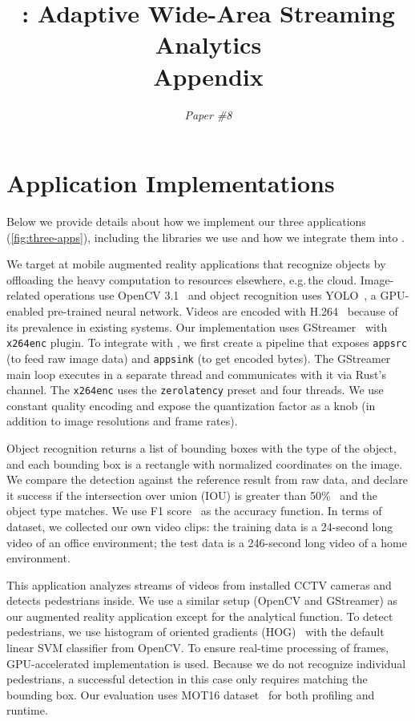 \documentclass[twocolumn, 9pt]{article}
\begin{document}
\title{\sysname{}: Adaptive Wide-Area Streaming Analytics \\ Appendix}
\author{ \textit{Paper \#8} }
\date{}
\maketitle

\section{Application Implementations}
\label{appendix:appl-impl}

Below we provide details about how we implement our three applications
(\autoref{fig:three-apps}), including the libraries we use and how we integrate
them into \sysname{}.

 We target at mobile augmented reality applications
that recognize objects by offloading the heavy computation to resources
elsewhere, e.g.\,the cloud.  Image-related operations use OpenCV
3.1~\cite{opencvlibrary} and object recognition uses YOLO~\cite{darknet13,
  redmon2016yolo9000}, a GPU-enabled pre-trained neural network. Videos are
encoded with H.264~\cite{richardson2011h} because of its prevalence in existing
systems. Our implementation uses GStreamer~\cite{gstreamer} with
\texttt{x264enc} plugin. To integrate with \sysname{}, we first create a
pipeline that exposes \texttt{appsrc} (to feed raw image data) and
\texttt{appsink} (to get encoded bytes). The GStreamer main loop executes in a
separate thread and \sysname{} communicates with it via Rust's channel. The
\texttt{x264enc} uses the \texttt{zerolatency} preset and four threads. We use
constant quality encoding and expose the quantization factor as a knob (in
addition to image resolutions and frame rates).

Object recognition returns a list of bounding boxes with the type of the object,
and each bounding box is a rectangle with normalized coordinates on the
image. We compare the detection against the reference result from raw data, and
declare it success if the intersection over union (IOU) is greater than
50\%~\cite{everingham2010pascal} and the object type matches. We use F1
score~\cite{Rijsbergen:1979:IR:539927} as the accuracy function. In terms of
dataset, we collected our own video clips: the training data is a 24-second long
video of an office environment; the test data is a 246-second long video of a
home environment.

 This application analyzes streams of videos from
installed CCTV cameras and detects pedestrians inside. We use a similar setup
(OpenCV and GStreamer) as our augmented reality application except for the
analytical function. To detect pedestrians, we use histogram of oriented
gradients (HOG)~\cite{dalal2005histograms} with the default linear SVM
classifier from OpenCV. To ensure real-time processing of frames,
GPU-accelerated implementation is used. Because we do not recognize individual
pedestrians, a successful detection in this case only requires matching the
bounding box. Our evaluation uses MOT16 dataset~\cite{milan2016mot16} for both
profiling and runtime.
\end{document}
